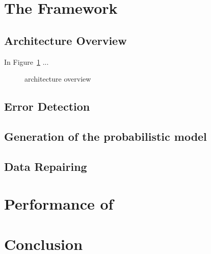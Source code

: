 \section{The \holoclean{} Framework}\label{sec:framework}
  
  \subsection{Architecture Overview}
  In Figure~\ref{fig:architecture} ...
  
  \begin{figure}[hbt]
    \centering
    
    \caption{\holoclean{} architecture overview}
    \label{fig:architecture}
  \end{figure}
    
  
  \subsection{Error Detection}

  \subsection{Generation of the probabilistic model}
  
  \subsection{Data Repairing}

\section{Performance of \holoclean{}}\label{sec:performance}

\section{Conclusion}\label{sec:conclusion}